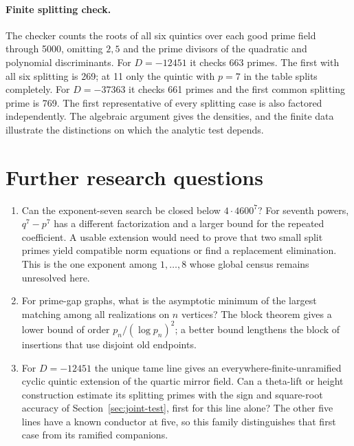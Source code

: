 \paragraph{Finite splitting check.}
The checker counts the roots of all six quintics over each good prime field through 5000, omitting $2,5$ and the prime divisors of the quadratic and polynomial discriminants. For $D=-12451$ it checks 663 primes. The first with all six splitting is 269; at 11 only the quintic with $p=7$ in the table splits completely. For $D=-37363$ it checks 661 primes and the first common splitting prime is 769. The first representative of every splitting case is also factored independently. The algebraic argument gives the densities, and the finite data illustrate the distinctions on which the analytic test depends.

\section{Further research questions}
\begin{enumerate}
\item Can the exponent-seven search be closed below $4\cdot4600^7$? For seventh powers, $q^7-p^7$ has a different factorization and a larger bound for the repeated coefficient. A usable extension would need to prove that two small split primes yield compatible norm equations or find a replacement elimination. This is the one exponent among $1,\ldots,8$ whose global census remains unresolved here.
\item For prime-gap graphs, what is the asymptotic minimum of the largest matching among all realizations on $n$ vertices? The block theorem gives a lower bound of order $p_n/(\log p_n)^2$; a better bound lengthens the block of insertions that use disjoint old endpoints.
\item For $D=-12451$ the unique tame line gives an everywhere-finite-unramified cyclic quintic extension of the quartic mirror field. Can a theta-lift or height construction estimate its splitting primes with the sign and square-root accuracy of Section~\ref{sec:joint-test}, first for this line alone? The other five lines have a known conductor at five, so this family distinguishes that first case from its ramified companions.
\end{enumerate}
